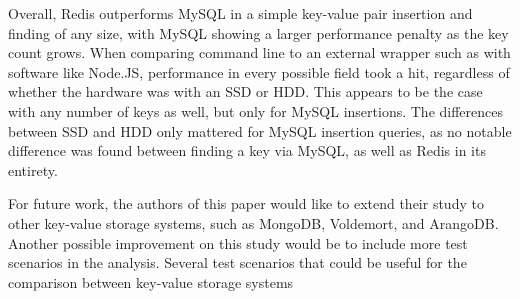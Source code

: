 \documentclass[letterpaper, 10 pt, conference]{ieeeconf}
\begin{document}
\begin{table}[h]

\caption{Performance of MySQL and Redis on HDD and SSDs with 100000 keys in all queries (in seconds)}
\end{table}
Overall, Redis outperforms MySQL in a simple key-value pair insertion and finding of any size, with MySQL showing a larger performance penalty as the key count grows. When comparing command line to an external wrapper such as with software like Node.JS, performance in every possible field took a hit, regardless of whether the hardware was with an SSD or HDD. This appears to be the case with any number of keys as well, but only for MySQL insertions. The differences between SSD and HDD only mattered for MySQL insertion queries, as no notable difference was found between finding a key via MySQL, as well as Redis in its entirety.

For future work, the authors of this paper would like to extend their study to other key-value storage systems, such as MongoDB, Voldemort, and ArangoDB. Another possible improvement on this study would be to include more test scenarios in the analysis. Several test scenarios that could be useful for the comparison between key-value storage systems 
\end{document}
